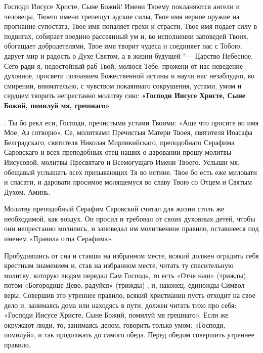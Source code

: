 {{\mychapterending

 





Господи Иисусе Христе, Сыне Божий! Имени Твоему покланяются ангели и человецы, Твоего имени трепещут адские силы, Твое имя верное оружие на прогнание супостата, Твое имя попаляет грехи и страсти, Твое имя подает силу в подвигах, собирает воедино рассеянный ум и, во исполнении заповедей Твоих, обогащает добродетелями, Твое имя творит чудеса и соединяет нас с Тобою, дарует мир и радость о Духе Святом, а в жизни будущей "--- Царство Небесное. Сего ради я, недостойный раб Твой, молюся Тебе: прожени от нас неведение духовное, просвети познанием Божественной истины и научи нас незаблудно, во смирении, внимательно, с чувством покаяннаго сокрушения, устами, умом и сердцем творить непрестанно молитву сию: \bfseries «Господи Иисусе Христе, Сыне Божий, помилуй мя, грешнаго»}. Ты бо рекл еси, Господи, пречистыми устами Твоими: «Аще что просите во имя Мое, Аз сотворю». Се, молитвами Пречистыя Матери Твоея, святителя Иоасафа Белградскаго, святителя Николая Мирликийскаго, преподобнаго Серафима Саровскаго и всех преподобных отец наших о даровании прошу молитвы Иисусовой,  молитвы  Пресвятаго и Всемогущаго Имени Твоего. Услыши мя, обещавый услышать всех призывающих Тя во истине. Твое бо есть еже миловати и спасати, и даровати просимое молящемуся во славу Твою со Отцем и Святым Духом. Аминь. 








\mychapterending

 





Молитву преподобный Серафим Саровский считал для жизни столь же необходимой, как  воздух. Он просил и требовал от своих духовных детей, чтобы они непрестанно молились, и заповедал им молитвенное правило, оставшееся под именем «Правила отца Серафима». 

Пробудившись от сна и ставши на избранном месте, всякий должен оградить себя крестным знамением и, став на избранном месте, читать ту спасительную молитву, которую людям передал Сам Господь, то есть «Отче наш» (трижды), потом «Богородице Дево, радуйся» (трижды) , и, наконец, единожды Символ веры. Совершив это утреннее правило, всякий христианин пусть отходит на свое дело и, занимаясь дома или находясь в пути, должен читать тихо про себя: «Господи Иисусе Христе, Сыне Божий, помилуй мя грешнаго». Если же окружают люди, то, занимаясь делом, говорить только умом: «Господи, помилуй», и так продолжать до самого обеда. Перед обедом совершить утреннее правило. 

}
